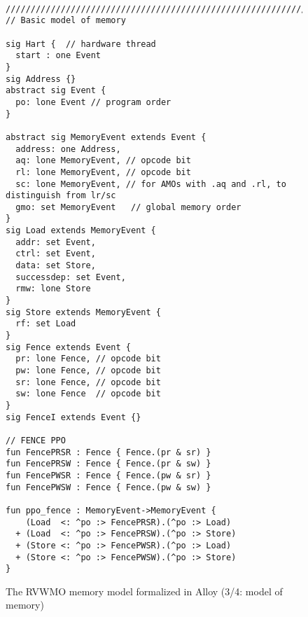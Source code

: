 \begin{figure}[h!]
  {
  \tt\bfseries\centering\footnotesize
  \begin{lstlisting}
////////////////////////////////////////////////////////////////////////////////
// Basic model of memory

sig Hart {  // hardware thread
  start : one Event
}
sig Address {}
abstract sig Event {
  po: lone Event // program order
}

abstract sig MemoryEvent extends Event {
  address: one Address,
  aq: lone MemoryEvent, // opcode bit
  rl: lone MemoryEvent, // opcode bit
  sc: lone MemoryEvent, // for AMOs with .aq and .rl, to distinguish from lr/sc
  gmo: set MemoryEvent   // global memory order
}
sig Load extends MemoryEvent {
  addr: set Event,
  ctrl: set Event,
  data: set Store,
  successdep: set Event,
  rmw: lone Store
}
sig Store extends MemoryEvent {
  rf: set Load
}
sig Fence extends Event {
  pr: lone Fence, // opcode bit
  pw: lone Fence, // opcode bit
  sr: lone Fence, // opcode bit
  sw: lone Fence  // opcode bit
}
sig FenceI extends Event {}
   
// FENCE PPO
fun FencePRSR : Fence { Fence.(pr & sr) } 
fun FencePRSW : Fence { Fence.(pr & sw) } 
fun FencePWSR : Fence { Fence.(pw & sr) } 
fun FencePWSW : Fence { Fence.(pw & sw) } 

fun ppo_fence : MemoryEvent->MemoryEvent {
    (Load  <: ^po :> FencePRSR).(^po :> Load)
  + (Load  <: ^po :> FencePRSW).(^po :> Store)
  + (Store <: ^po :> FencePWSR).(^po :> Load)
  + (Store <: ^po :> FencePWSW).(^po :> Store)
}
\end{lstlisting}}
  \caption{The RVWMO memory model formalized in Alloy (3/4: model of memory)}
  \label{fig:alloy3}
\end{figure}
